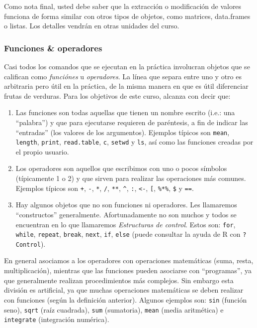 \documentclass[]{article}
\begin{document}
Como nota final, usted debe saber que la extracción o modificación de
valores funciona de forma similar con otros tipos de objetos, como
matrices, data.frames o listas. Los detalles vendrán en otras unidades
del curso.

\subsubsection{Funciones \& operadores}

Casi todos los comandos que se ejecutan en la práctica involucran
objetos que se califican como \emph{funciónes} u \emph{operadores}. La
línea que separa entre uno y otro es arbitraria pero útil en la
práctica, de la misma manera en que es útil diferenciar frutas de
verduras. Para los objetivos de este curso, alcanza con decir que:

\begin{enumerate}[1.]
\item
  Las funciones son todas aquellas que tienen un nombre escrito (i.e.:
  una ``palabra'') y que para ejecutarse requieren de paréntesis, a fin
  de indicar las ``entradas'' (los valores de los argumentos). Ejemplos
  típicos son \texttt{mean}, \texttt{length}, \texttt{print},
  \texttt{read.table}, \texttt{c}, \texttt{setwd} y \texttt{ls}, así
  como las funciones creadas por el propio usuario.
\item
  Los operadores son aquellos que escribimos con uno o pocos símbolos
  (típicamente 1 o 2) y que sirven para realizar las operaciones más
  comunes. Ejemplos típicos son \texttt{+}, \texttt{-}, \texttt{*},
  \texttt{/}, \texttt{**}, \texttt{\^{}}, \texttt{:},
  \texttt{\textless{}-}, \texttt{{[}}, \texttt{\%*\%}, \texttt{\$} y
  \texttt{==}.
\item
  Hay algunos objetos que no son funciones ni operadores. Les llamaremos
  ``constructos'' generalmente. Afortunadamente no son muchos y todos se
  encuentran en lo que llamaremos \emph{Estructuras de control}. Estos
  son: \texttt{for}, \texttt{while}, \texttt{repeat}, \texttt{break},
  \texttt{next}, \texttt{if}, \texttt{else} (puede consultar la ayuda de
  R con \texttt{?Control}).
\end{enumerate}
En general asociamos a los operadores con operaciones matemáticas (suma,
resta, multiplicación), mientras que las funciones pueden asociarse con
``programas'', ya que generalmente realizan procedimientos más
complejos. Sin embargo esta división es artificial, ya que muchas
operaciones matemáticas se deben realizar con funciones (según la
definición anterior). Algunos ejemplos son: \texttt{sin} (función seno),
\texttt{sqrt} (raíz cuadrada), \texttt{sum} (sumatoria), \texttt{mean}
(media aritmética) e \texttt{integrate} (integración numérica).
\end{document}
